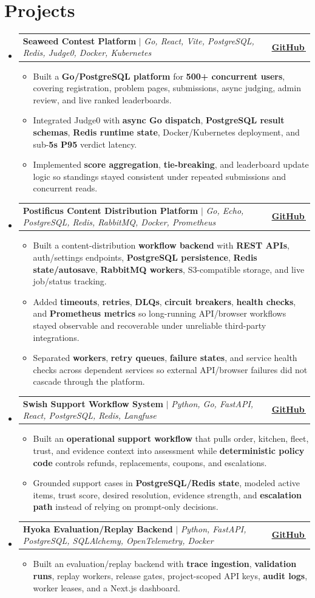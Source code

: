 \documentclass[letterpaper,11pt]{article}
\makeatletter
\newcommand{\bodyhref}[2]{\href{#1}{\underline{#2}\,\faExternalLink*}}
\newcommand{\resumeItem}[1]{\item{\fontsize{9.05pt}{9.75pt}\selectfont #1\vspace{-0.7pt}}}
\newcommand{\resumeProjectHeading}[2]{
    \item
    \begin{tabular*}{1.0\textwidth}{l@{\extracolsep{\fill}}r}
      \small#1 & \textbf{\small #2}\\
    \end{tabular*}\vspace{-4pt}
}
\newcommand{\resumeSubHeadingListStart}{\begin{itemize}[leftmargin=0.0in, label={}, itemsep=0.6pt, topsep=0pt, parsep=0pt, partopsep=0pt]}
\newcommand{\resumeSubHeadingListEnd}{\end{itemize}}
\newcommand{\resumeItemListStart}{\begin{itemize}[leftmargin=0.16in,itemsep=0.3pt,topsep=0.9pt,parsep=0pt,partopsep=0pt]}
\newcommand{\resumeItemListEnd}{\end{itemize}\vspace{-3pt}}
\makeatother
\begin{document}
\section{Projects}
\resumeSubHeadingListStart
\resumeProjectHeading
{\textbf{Seaweed Contest Platform} $|$ \emph{Go, React, Vite, PostgreSQL, Redis, Judge0, Docker, Kubernetes}}{\bodyhref{https://github.com/unichronic/seaweed-fe}{GitHub}}
\resumeItemListStart
\resumeItem{Built a \textbf{Go/PostgreSQL platform} for \textbf{500+ concurrent users}, covering registration, problem pages, submissions, async judging, admin review, and live ranked leaderboards.}
\resumeItem{Integrated Judge0 with \textbf{async Go dispatch}, \textbf{PostgreSQL result schemas}, \textbf{Redis runtime state}, Docker/Kubernetes deployment, and sub-\textbf{5s P95} verdict latency.}
\resumeItem{Implemented \textbf{score aggregation}, \textbf{tie-breaking}, and leaderboard update logic so standings stayed consistent under repeated submissions and concurrent reads.}
\resumeItemListEnd
\resumeProjectHeading
{\textbf{Postificus Content Distribution Platform} $|$ \emph{Go, Echo, PostgreSQL, Redis, RabbitMQ, Docker, Prometheus}}{\bodyhref{https://github.com/unichronic/postificus}{GitHub}}
\resumeItemListStart
\resumeItem{Built a content-distribution \textbf{workflow backend} with \textbf{REST APIs}, auth/settings endpoints, \textbf{PostgreSQL persistence}, \textbf{Redis state/autosave}, \textbf{RabbitMQ workers}, S3-compatible storage, and live job/status tracking.}
\resumeItem{Added \textbf{timeouts}, \textbf{retries}, \textbf{DLQs}, \textbf{circuit breakers}, \textbf{health checks}, and \textbf{Prometheus metrics} so long-running API/browser workflows stayed observable and recoverable under unreliable third-party integrations.}
\resumeItem{Separated \textbf{workers}, \textbf{retry queues}, \textbf{failure states}, and service health checks across dependent services so external API/browser failures did not cascade through the platform.}
\resumeItemListEnd
\resumeProjectHeading
{\textbf{Swish Support Workflow System} $|$ \emph{Python, Go, FastAPI, React, PostgreSQL, Redis, Langfuse}}{\bodyhref{https://github.com/unichronic/swishagent}{GitHub}}
\resumeItemListStart
\resumeItem{Built an \textbf{operational support workflow} that pulls order, kitchen, fleet, trust, and evidence context into assessment while \textbf{deterministic policy code} controls refunds, replacements, coupons, and escalations.}
\resumeItem{Grounded support cases in \textbf{PostgreSQL/Redis state}, modeled active items, trust score, desired resolution, evidence strength, and \textbf{escalation path} instead of relying on prompt-only decisions.}
\resumeItemListEnd
\resumeProjectHeading
{\textbf{Hyoka Evaluation/Replay Backend} $|$ \emph{Python, FastAPI, PostgreSQL, SQLAlchemy, OpenTelemetry, Docker}}{\bodyhref{https://github.com/unichronic/hyoka}{GitHub}}
\resumeItemListStart
\resumeItem{Built an evaluation/replay backend with \textbf{trace ingestion}, \textbf{validation runs}, replay workers, release gates, project-scoped API keys, \textbf{audit logs}, worker leases, and a Next.js dashboard.}
\resumeItemListEnd
\resumeSubHeadingListEnd
\end{document}
